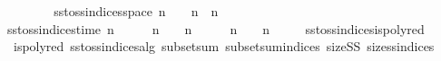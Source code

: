 {\ \ \ \ {\isacharbraceright}{\kern0pt}\isanewline
\ \ {\isacharbraceright}{\kern0pt}{\isachardoublequoteclose}\isanewline
\isanewline
{}\isamarkupfalse%
\ {\isachardoublequoteopen}ss{\isacharunderscore}{\kern0pt}to{\isacharunderscore}{\kern0pt}ss{\isacharunderscore}{\kern0pt}indices{\isacharunderscore}{\kern0pt}space\ n\ {\isacharequal}{\kern0pt}\ {}\ {\isacharplus}{\kern0pt}\ n\ {\isacharplus}{\kern0pt}\ n\ {\isacharplus}{\kern0pt}\ {}{\isachardoublequoteclose}\isanewline
{}\isamarkupfalse%
\ {\isachardoublequoteopen}ss{\isacharunderscore}{\kern0pt}to{\isacharunderscore}{\kern0pt}ss{\isacharunderscore}{\kern0pt}indices{\isacharunderscore}{\kern0pt}time\ n\ {\isacharequal}{\kern0pt}\ {}\ {\isacharplus}{\kern0pt}\ {\isacharparenleft}{\kern0pt}{}\ {\isacharasterisk}{\kern0pt}\ n\ {\isacharplus}{\kern0pt}\ {}\ {\isacharasterisk}{\kern0pt}\ n\ {\isacharplus}{\kern0pt}\ {}{\isacharparenright}{\kern0pt}\ {\isacharplus}{\kern0pt}\ {\isacharparenleft}{\kern0pt}{}\ {\isacharasterisk}{\kern0pt}\ n\ {\isacharplus}{\kern0pt}\ {}\ {\isacharasterisk}{\kern0pt}\ n\ {\isacharplus}{\kern0pt}\ {}{\isacharparenright}{\kern0pt}\ {\isacharplus}{\kern0pt}\ {}{\isachardoublequoteclose}\isanewline
\isanewline
{}\isamarkupfalse%
\ ss{\isacharunderscore}{\kern0pt}to{\isacharunderscore}{\kern0pt}ss{\isacharunderscore}{\kern0pt}indices{\isacharunderscore}{\kern0pt}is{\isacharunderscore}{\kern0pt}polyred{\isacharcolon}{\kern0pt}\isanewline
\ \ {\isachardoublequoteopen}ispolyred\ ss{\isacharunderscore}{\kern0pt}to{\isacharunderscore}{\kern0pt}ss{\isacharunderscore}{\kern0pt}indices{\isacharunderscore}{\kern0pt}alg\ subset{\isacharunderscore}{\kern0pt}sum\ subset{\isacharunderscore}{\kern0pt}sum{\isacharunderscore}{\kern0pt}indices\ size{\isacharunderscore}{\kern0pt}SS\ size{\isacharunderscore}{\kern0pt}ss{\isacharunderscore}{\kern0pt}indices{\isachardoublequoteclose}
}

